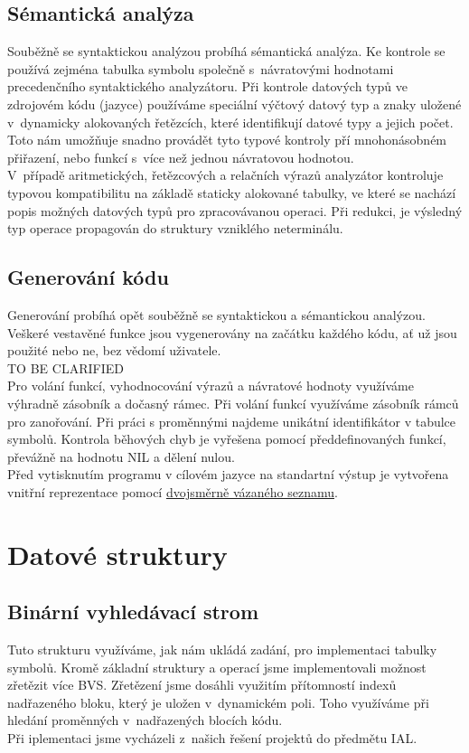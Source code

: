 \documentclass[11pt]{article}
\begin{document}
	\subsection{Sémantická analýza}
    	Souběžně se syntaktickou analýzou probíhá sémantická analýza. Ke kontrole se používá zejména tabulka symbolu společně s~návratovými hodnotami precedenčního syntaktického analyzátoru. Při kontrole datových typů ve zdrojovém kódu (jazyce) používáme speciální výčtový datový typ a znaky uložené v~dynamicky alokovaných řetězcích, které identifikují datové typy a jejich počet. Toto nám umožňuje snadno provádět tyto typové kontroly pří mnohonásobném přiřazení, nebo funkcí s~více než jednou návratovou hodnotou. \\
    	\indent V~případě aritmetických, řetězcových a relačních výrazů	 analyzátor kontroluje typovou kompatibilitu na základě staticky alokované tabulky, ve které se nachází popis možných datových typů pro zpracovávanou operaci. Při redukci, je výsledný typ operace propagován do struktury vzniklého neterminálu.
    	
        \pagebreak
        
	\subsection{Generování kódu}
	    Generování probíhá opět souběžně se syntaktickou a sémantickou analýzou. Veškeré vestavěné funkce jsou vygenerovány na začátku každého kódu, ať už jsou použité nebo ne, bez vědomí uživatele. \\
	    \indent \indent TO BE CLARIFIED \\
	    \indent Pro volání funkcí, vyhodnocování výrazů a návratové hodnoty využíváme výhradně zásobník a dočasný rámec. Při volání funkcí využíváme zásobník rámců pro zanořování. Při práci s proměnnými najdeme unikátní identifikátor v tabulce symbolů. Kontrola běhových chyb je vyřešena pomocí předdefinovaných funkcí, převážně na hodnotu NIL a dělení nulou. \\
	    \indent Před vytisknutím programu v cílovém jazyce na standartní výstup je vytvořena vnitřní reprezentace pomocí \hyperref[sec:dll]{dvojsměrně vázaného seznamu}. 
	    
	\vspace{5mm}
    \section{Datové struktury}
    
    \subsection{Binární vyhledávací strom}
        Tuto strukturu využíváme, jak nám ukládá zadání, pro implementaci tabulky symbolů. Kromě základní struktury a operací jsme implementovali možnost zřetězit více BVS. Zřetězení jsme dosáhli využitím přítomností indexů nadřazeného bloku, který je uložen v~dynamickém poli. Toho využíváme při hledání proměnných v~nadřazených blocích kódu.\\
        Při iplementaci jsme vycházeli z~našich řešení projektů do předmětu IAL.
    
\end{document}

